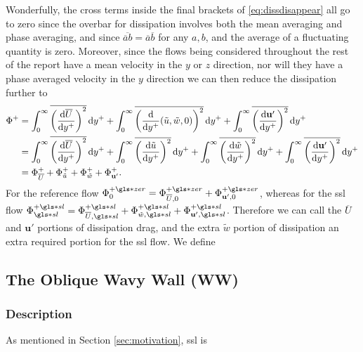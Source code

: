 Wonderfully, the cross terms inside the final brackets of \ref{eq:dissdisappear} all go to zero since the overbar for dissipation involves both the mean averaging and phase averaging, and since $\overline{\overline{a}b}=\overline{a}\overline{b}$ for any $a,b$, and the average of a fluctuating quantity is zero.
Moreover, since the flows being considered throughout the rest of the report have a mean velocity in the $y$ or $z$ direction, nor will they have a phase averaged velocity in the $y$ direction we can then reduce the dissipation further to 
\begin{align}
	\Phi ^{+} &=\int_{0}^{\infty}  \overline{\left( \dv{\overline{U}}{y\ensuremath{^{+}}}  \right) ^2}\dd{y\ensuremath{^{+}}}+\int_{0}^{\infty}  \overline{\left( \dv{y\ensuremath{^{+}}}(\tilde{u},\tilde{w},0)  \right) ^2} \dd{y\ensuremath{^{+}}} + \int_{0}^{\infty}  \overline{\left(\dv{\mathbf{u'} }{y\ensuremath{^{+}}}\right) ^2} \dd{y\ensuremath{^{+}}}\\
	&=\int_{0}^{\infty}  \overline{\left( \dv{\overline{U}}{y\ensuremath{^{+}}}  \right) ^2}\dd{y\ensuremath{^{+}}}+\int_{0}^{\infty}  \overline{\left( \dv{\tilde{u}}{y\ensuremath{^{+}}}  \right) ^2} \dd{y\ensuremath{^{+}}} +\int_{0}^{\infty}  \overline{\left( \dv{\tilde{w}}{y\ensuremath{^{+}}}  \right) ^2} \dd{y\ensuremath{^{+}}} + \int_{0}^{\infty}  \overline{\left(\dv{\mathbf{u'} }{y\ensuremath{^{+}}}\right) ^2} \dd{y\ensuremath{^{+}}}\\
	&= \Phi_{\overline{U}}^{+} + \Phi _{\tilde{u}}^{+} + \Phi _{\tilde{w}}^{+} + \Phi _{\mathbf{u'} }^{+}
.\end{align}
For the reference flow $\Phi _{0}\pz=\Phi _{\overline{U},0}\pz+\Phi _{\mathbf{u'} ,0}\pz$, whereas for the \gls{ssl} flow $\Phi \ssl\ps=\Phi _{\overline{U},\gls*{sl}}\ps + \Phi _{\tilde{w},\gls*{sl}}\ps + \Phi _{\mathbf{u'},\gls*{sl} }\ps$. Therefore we can call the $\overline{U}$ and $\mathbf{u'} $ portions of dissipation drag, and the extra $\tilde{w}$ portion of dissipation an extra required portion for the \gls{ssl} flow. We define


\subsection{The Oblique Wavy Wall (WW)}
\subsubsection{Description}
As mentioned in Section \ref{sec:motivation}, \gls{ssl} is




